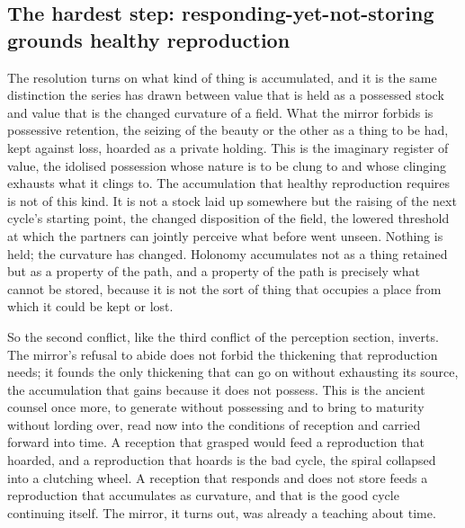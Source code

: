 \subsection{The hardest step: responding-yet-not-storing grounds healthy reproduction}
\label{p22:sub:reception-hardest}

The resolution turns on what kind of thing is accumulated, and it is the same distinction the series has drawn between value that is held as a possessed stock and value that is the changed curvature of a field. What the mirror forbids is possessive retention, the seizing of the beauty or the other as a thing to be had, kept against loss, hoarded as a private holding. This is the imaginary register of value, the idolised possession whose nature is to be clung to and whose clinging exhausts what it clings to. The accumulation that healthy reproduction requires is not of this kind. It is not a stock laid up somewhere but the raising of the next cycle's starting point, the changed disposition of the field, the lowered threshold at which the partners can jointly perceive what before went unseen. Nothing is held; the curvature has changed. Holonomy accumulates not as a thing retained but as a property of the path, and a property of the path is precisely what cannot be stored, because it is not the sort of thing that occupies a place from which it could be kept or lost.


So the second conflict, like the third conflict of the perception section, inverts. The mirror's refusal to abide does not forbid the thickening that reproduction needs; it founds the only thickening that can go on without exhausting its source, the accumulation that gains because it does not possess. This is the ancient counsel once more, to generate without possessing and to bring to maturity without lording over, read now into the conditions of reception and carried forward into time. A reception that grasped would feed a reproduction that hoarded, and a reproduction that hoards is the bad cycle, the spiral collapsed into a clutching wheel. A reception that responds and does not store feeds a reproduction that accumulates as curvature, and that is the good cycle continuing itself. The mirror, it turns out, was already a teaching about time.

